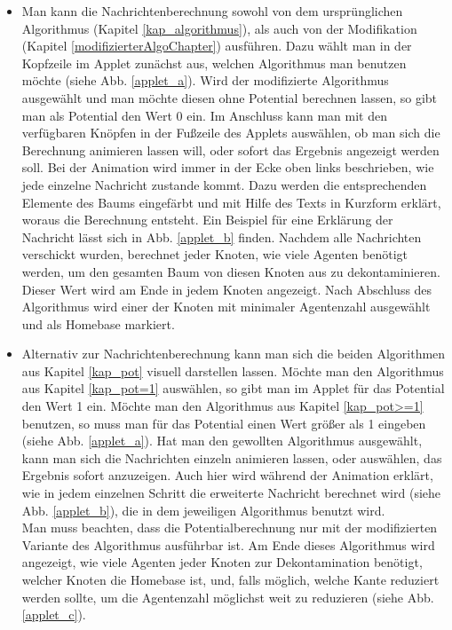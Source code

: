 \begin{itemize}
	\item Man kann die Nachrichtenberechnung sowohl von dem ursprünglichen Algorithmus (Kapitel \ref{kap_algorithmus}), als auch von der Modifikation (Kapitel \ref{modifizierterAlgoChapter}) ausführen. Dazu wählt man in der Kopfzeile im Applet zunächst aus, welchen Algorithmus man benutzen möchte (siehe Abb. \ref{applet_a}). Wird der modifizierte Algorithmus ausgewählt und man möchte diesen ohne Potential berechnen lassen, so gibt man als Potential den Wert 0 ein. Im Anschluss kann man mit den verfügbaren Knöpfen in der Fußzeile des Applets auswählen, ob man sich die Berechnung animieren lassen will, oder sofort das Ergebnis angezeigt werden soll. Bei der Animation wird immer in der Ecke oben links beschrieben, wie jede einzelne Nachricht zustande kommt. Dazu werden die entsprechenden Elemente des Baums eingefärbt und mit Hilfe des Texts in Kurzform erklärt, woraus die Berechnung entsteht. Ein Beispiel für eine Erklärung der Nachricht lässt sich in Abb. \ref{applet_b} finden. Nachdem alle Nachrichten verschickt wurden, berechnet jeder Knoten, wie viele Agenten benötigt werden, um den gesamten Baum von diesen Knoten aus zu dekontaminieren. Dieser Wert wird am Ende in jedem Knoten angezeigt. Nach Abschluss des Algorithmus wird einer der Knoten mit minimaler Agentenzahl ausgewählt und als Homebase markiert.
	
	\item Alternativ zur Nachrichtenberechnung kann man sich die beiden Algorithmen aus Kapitel \ref{kap_pot} visuell darstellen lassen. Möchte man den Algorithmus aus Kapitel \ref{kap_pot=1} auswählen, so gibt man im Applet für das Potential den Wert 1 ein. Möchte man den Algorithmus aus Kapitel \ref{kap_pot>=1} benutzen, so muss man für das Potential einen Wert größer als 1 eingeben (siehe Abb. \ref{applet_a}). Hat man den gewollten Algorithmus ausgewählt, kann man sich die Nachrichten einzeln animieren lassen, oder auswählen, das Ergebnis sofort anzuzeigen. Auch hier wird während der Animation erklärt, wie in jedem einzelnen Schritt die erweiterte Nachricht berechnet wird (siehe Abb. \ref{applet_b}), die in dem jeweiligen Algorithmus benutzt wird. \\
	Man muss beachten, dass die Potentialberechnung nur mit der modifizierten Variante des Algorithmus ausführbar ist. Am Ende dieses Algorithmus wird angezeigt, wie viele Agenten jeder Knoten zur Dekontamination benötigt, welcher Knoten die Homebase ist, und, falls möglich, welche Kante reduziert werden sollte, um die Agentenzahl möglichst weit zu reduzieren (siehe Abb. \ref{applet_c}).
	

\end{itemize}
